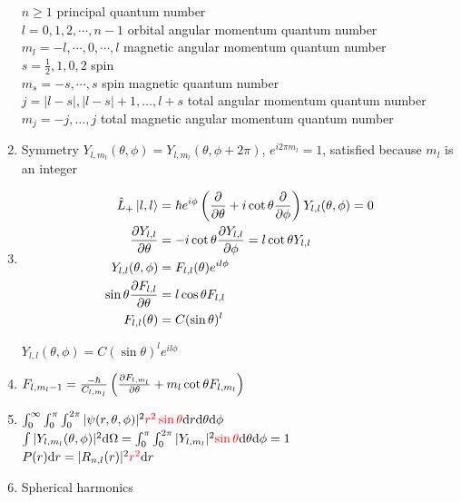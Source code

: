 \documentclass{article}
\theoremstyle{remark}
\theoremstyle{remark}
\begin{document}
\begin{enumerate}
    \begin{framed}
        $n\geq 1$ \hfill principal quantum number\\
        $l = 0,1,2,\cdots, n-1$ \hfill orbital angular momentum quantum number\\
        $m_l = -l,\cdots,0,\cdots,l$ \hfill magnetic angular momentum quantum number\\
        $s = \frac{1}{2},1,0,2$ \hfill spin\\
        $m_s = -s,\cdots,s$ \hfill spin magnetic quantum number\\
        $j = |l-s|,|l-s|+1,\ldots,l+s$ \hfill total angular momentum quantum number\\
        $m_j = -j,\ldots,j$ \hfill total magnetic angular momentum quantum number
    \end{framed}
    \item Symmetry $Y_{l,m_l}(\theta,\phi)=Y_{l,m_l}(\theta,\phi+2\pi)$, $e^{i2\pi m_l}=1$, satisfied because $m_l$ is an integer
    \item \begin{align*}
        \hat{L}_+\ket{l,l}&=\hbar e^{i\phi}\left(\pdv{\theta}+i\cot\theta\pdv{\phi}\right)Y_{l,l}(\theta,\phi)=0\\
        \pdv{Y_{l,l}}{\theta} &= -i\cot\theta\pdv{Y_{l,l}}{\phi} = l\cot\theta Y_{l,l}\\
        Y_{l,l}(\theta,\phi) &= F_{l,l}(\theta)e^{il\phi}\\
        \sin\theta\pdv{F_{l,l}}{\theta}&=l\cos\theta F_{l,l}\\
        F_{l,l}(\theta)&=C(\sin\theta)^l
    \end{align*}
    \begin{center}
        $\boxed{Y_{l,l}(\theta,\phi)=C(\sin\theta)^l e^{il\phi}}$
    \end{center}
    \item $F_{l,m_l-1}=\frac{-\hbar}{C_{l,m_l}}\left(\pdv{F_{l,m_l}}{\theta}+m_l\cot\theta F_{l,m_l}\right)$
    \item $\int_0^\infty\int_0^\pi\int_0^{2\pi}|\psi(r,\theta,\phi)|^2\textcolor{red}{r^2\sin\theta}\dd r\dd\theta\dd\phi$\\
        $\int|Y_{l,m_l}(\theta,\phi)|^2\dd\Omega=\int_0^\pi\int_0^{2\pi}|Y_{l,m_l}|^2\textcolor{red}{\sin\theta}\dd\theta\dd\phi=1 $\\
        $P(r)\dd r = |R_{n,l}(r)|^2 \textcolor{red}{r^2}\dd r$
    \item Spherical harmonics \begin{itemize}

\end{itemize}
\end{enumerate}
\end{document}
